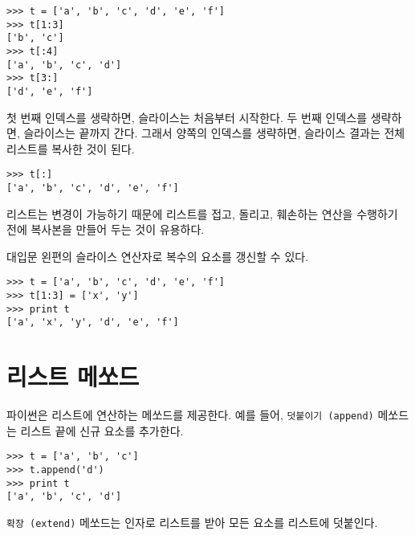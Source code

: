 \beforeverb
\begin{verbatim}
>>> t = ['a', 'b', 'c', 'd', 'e', 'f']
>>> t[1:3]
['b', 'c']
>>> t[:4]
['a', 'b', 'c', 'd']
>>> t[3:]
['d', 'e', 'f']
\end{verbatim}
\afterverb
%

첫 번째 인덱스를 생략하면, 슬라이스는 처음부터 시작한다. 
두 번째 인덱스를 생략하면, 슬라이스는 끝까지 간다.
그래서 양쪽의 인덱스를 생략하면, 슬라이스 결과는 전체 리스트를 복사한 것이 된다.


\beforeverb
\begin{verbatim}
>>> t[:]
['a', 'b', 'c', 'd', 'e', 'f']
\end{verbatim}
\afterverb
%

리스트는 변경이 가능하기 때문에 리스트를 접고, 돌리고, 훼손하는 연산을 수행하기 전에 복사본을 만들어 두는 것이 유용하다.


대입문 왼편의 슬라이스 연산자로 복수의 요소를 갱신할 수 있다.


\beforeverb
\begin{verbatim}
>>> t = ['a', 'b', 'c', 'd', 'e', 'f']
>>> t[1:3] = ['x', 'y']
>>> print t
['a', 'x', 'y', 'd', 'e', 'f']
\end{verbatim}
\afterverb
%

\section{리스트 메쏘드}


파이썬은 리스트에 연산하는 메쏘드를 제공한다. 
예를 들어, {\tt 덧붙이기 (append)} 메쏘드는 리스트 끝에 신규 요소를 추가한다.


\beforeverb
\begin{verbatim}
>>> t = ['a', 'b', 'c']
>>> t.append('d')
>>> print t
['a', 'b', 'c', 'd']
\end{verbatim}
\afterverb
%
{\tt 확장 (extend)} 메쏘드는 인자로 리스트를 받아 모든 요소를 리스트에 덧붙인다.


